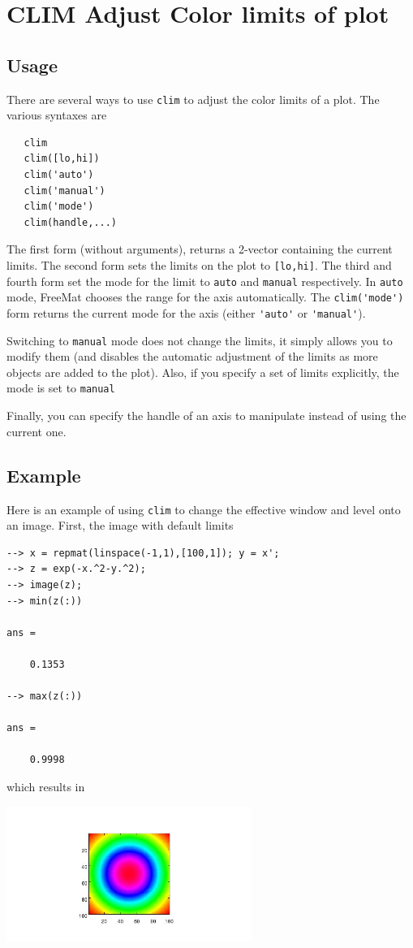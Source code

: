 \section{CLIM Adjust Color limits of plot}

\subsection{Usage}

There are several ways to use \verb|clim| to adjust the color limits of
a plot.  The various syntaxes are
\begin{verbatim}
   clim
   clim([lo,hi])   
   clim('auto')
   clim('manual')
   clim('mode')
   clim(handle,...)
\end{verbatim}
The first form (without arguments), returns a 2-vector containing the
current limits.  The second form sets the limits on the plot to \verb|[lo,hi]|.
The third and fourth form set the mode for the limit to \verb|auto| and \verb|manual|
respectively.  In \verb|auto| mode, FreeMat chooses the range for the axis 
automatically.  The \verb|clim('mode')| form returns the current mode for the axis
(either \verb|'auto'| or \verb|'manual'|).  

Switching to \verb|manual| mode does not change the limits, it simply allows
 you to modify them (and disables the automatic adjustment of the limits
as more objects are added to the plot).  Also, if you specify a set of 
limits explicitly, the mode is set to \verb|manual|
 
Finally, you can specify the handle of an
axis to manipulate instead of using the current one.
\subsection{Example}

Here is an example of using \verb|clim| to change the effective window and
level onto an image.  First, the image with default
limits
\begin{verbatim}
--> x = repmat(linspace(-1,1),[100,1]); y = x';
--> z = exp(-x.^2-y.^2);
--> image(z);
--> min(z(:))

ans = 

    0.1353 

--> max(z(:))

ans = 

    0.9998 
\end{verbatim}
which results in


\centerline{\includegraphics[width=8cm]{clim1}}

